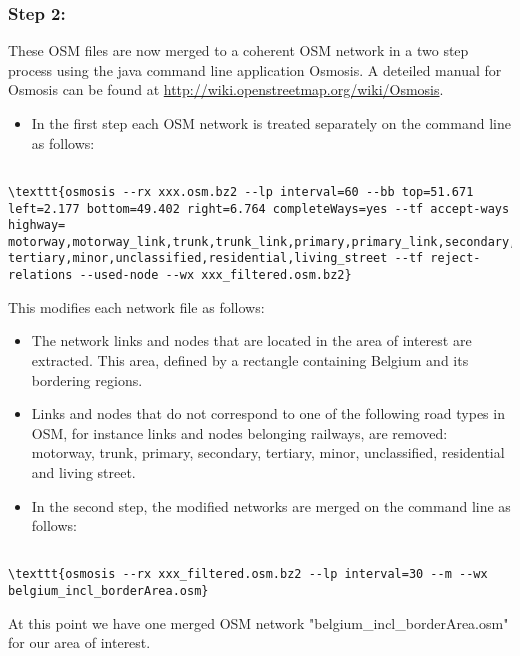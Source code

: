 \documentclass[a4paper,11pt]{report}
\begin{document}
\subsubsection{Step 2:}

These OSM files are now merged to a coherent OSM network in a two  step process using the java command line application Osmosis. A deteiled  manual for Osmosis can be found at \href{http://wiki.openstreetmap.org/wiki/Osmosis}{http://wiki.openstreetmap.org/wiki/Osmosis}.
\begin{itemize}
	\item In the first step each OSM network is treated separately on the command line as follows:
\end{itemize}
\begin{verbatim}

\texttt{osmosis --rx xxx.osm.bz2 --lp interval=60 --bb top=51.671 left=2.177 bottom=49.402 right=6.764 completeWays=yes --tf accept-ways highway= motorway,motorway_link,trunk,trunk_link,primary,primary_link,secondary, tertiary,minor,unclassified,residential,living_street --tf reject-relations --used-node --wx xxx_filtered.osm.bz2}
\end{verbatim}

This modifies each network file as follows:
\begin{itemize}
	\item The network links and nodes that are  located in the area of interest are extracted. This area, defined by a  rectangle containing Belgium and its bordering regions.
	\item Links and nodes that do not correspond  to one of the following road types in OSM, for instance links and nodes  belonging railways, are removed: motorway, trunk, primary, secondary,  tertiary, minor, unclassified, residential and living street.
\end{itemize}
\begin{itemize}
	\item In the second step, the modified networks are merged on the command line as follows:
\end{itemize}
\begin{verbatim}

\texttt{osmosis --rx xxx_filtered.osm.bz2 --lp interval=30 --m --wx belgium_incl_borderArea.osm}
\end{verbatim}

At this point we have one merged OSM network "belgium\_incl\_borderArea.osm" for our area of interest.
\end{document}
